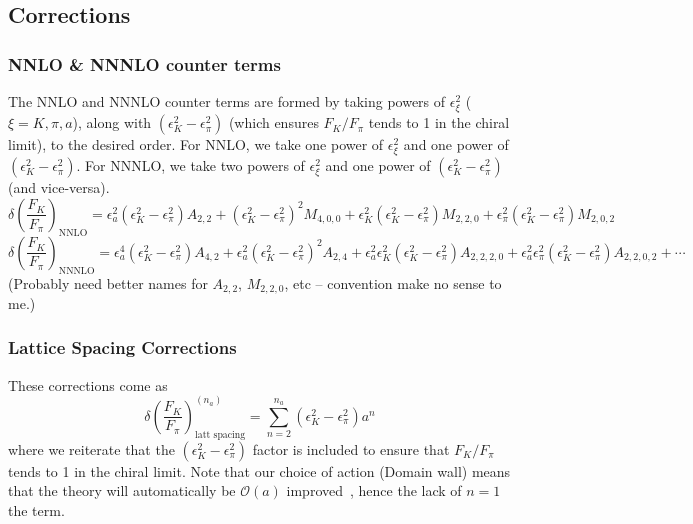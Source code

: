 \documentclass[prd,tightenlines,preprintnumbers,showpacs,superscriptaddress,notitlepage,nofootinbib,eqsecnum,floatfix,notitlepage]{revtex4-1}
\begin{document}
\subsection{Corrections}

\subsubsection{NNLO \& NNNLO counter terms}
The NNLO and NNNLO counter terms are formed by taking powers of $\epsilon^2_\xi$ ($\xi = K, \pi, a$), along with $(\epsilon_K^2 - \epsilon_\pi^2)$ (which ensures $F_K / F_\pi$ tends to 1 in the chiral limit), to the desired order. For NNLO, we take one power of $\epsilon^2_\xi$ and one power of $(\epsilon_K^2 - \epsilon_\pi^2)$. For NNNLO, we take two powers of $\epsilon^2_\xi$ and one power of $(\epsilon_K^2 - \epsilon_\pi^2)$ (and vice-versa).
\begin{equation}
\delta\left(\frac{F_K}{F_\pi}\right)_\text{NNLO} = \epsilon_a^2 (\epsilon_K^2 - \epsilon_\pi^2) A_{2,2}
+(\epsilon_K^2 - \epsilon_\pi^2)^2 M_{4,0,0}
+\epsilon_K^2 (\epsilon_K^2 - \epsilon_\pi^2) M_{2,2,0}
+\epsilon_\pi^2 (\epsilon_K^2 - \epsilon_\pi^2) M_{2,0,2}
\end{equation}
\begin{equation}
\delta\left(\frac{F_K}{F_\pi}\right)_\text{NNNLO} = \epsilon_a^4 (\epsilon_K^2 - \epsilon_\pi^2) A_{4,2}
+\epsilon_a^2 (\epsilon_K^2 - \epsilon_\pi^2)^2 A_{2,4}
+\epsilon_a^2 \epsilon_K^2 (\epsilon_K^2 - \epsilon_\pi^2) A_{2,2,2,0}
+\epsilon_a^2 \epsilon_\pi^2 (\epsilon_K^2 - \epsilon_\pi^2) A_{2,2,0,2}
+\cdots
\end{equation}
(Probably need better names for $A_{2, 2}$, $M_{2, 2, 0}$, etc -- convention make no sense to me.)

\subsubsection{Lattice Spacing Corrections}
These corrections come as 
\begin{equation}
\delta\left(\frac{F_K}{F_\pi}\right)_\text{latt spacing}^{(n_a)} = \sum_{n=2}^{n_a} (\epsilon_K^2 - \epsilon_\pi^2) a^n
\end{equation}
where we reiterate that the $(\epsilon_K^2 - \epsilon_\pi^2)$ factor is included to ensure that $F_K/F_\pi$ tends to 1 in the chiral limit. Note that our choice of action (Domain wall) means that the theory will automatically be $\mathcal{O}(a)$ improved~\cite{Berkowitz:2017opd}, hence the lack of $n=1$ the term.
\end{document}
